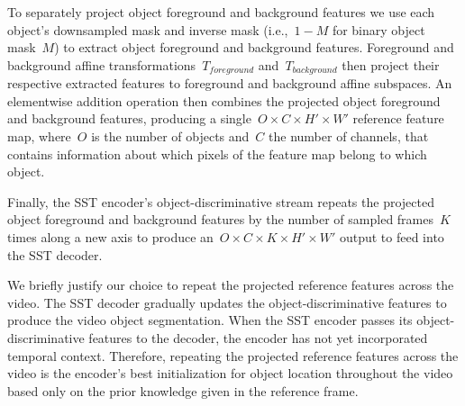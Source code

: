 To separately project object foreground and background features we use each
object's downsampled mask and inverse mask (i.e.,~$1 - M$ for binary object
mask~$M$) to extract object foreground and background features.
Foreground and background affine transformations~$T_{foreground}$
and~$T_{background}$ then project their respective extracted features to
foreground and background affine subspaces.
An elementwise addition operation then combines the projected object foreground
and background features, producing a single~$O\times C\times H'\times W'$
reference feature map, where~$O$ is the number of objects and~$C$ the number of
channels, that contains information about which pixels of the feature map
belong to which object.

Finally, the SST encoder's object-discriminative stream repeats the projected
object foreground and background features by the number of sampled frames~$K$
times along a new axis to produce an~$O\times C\times K\times H'\times W'$
output to feed into the SST decoder.

We briefly justify our choice to repeat the projected reference features across
the video.
The SST decoder gradually updates the object-discriminative features to produce
the video object segmentation.
When the SST encoder passes its object-discriminative features to the decoder,
the encoder has not yet incorporated temporal context.
Therefore, repeating the projected reference features across the video is the
encoder's best initialization for object location throughout the video based
only on the prior knowledge given in the reference frame.

